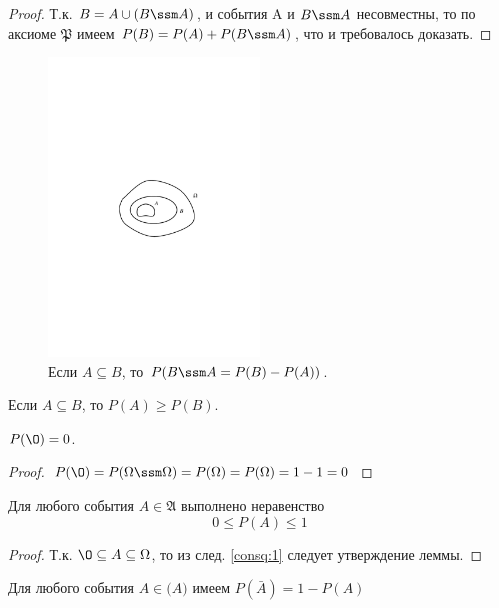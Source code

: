 \begin{proof}
	Т.к. $B=A\cup(B\ssm A)$,  и события A и $B\ssm A $ несовместны, то по аксиоме $\mathfrak{P}$ имеем $P(B)=P(A)+P(B\ssm A)$, что и требовалось доказать.
\end{proof}
\begin{figure}[H]
	\centering
	\includegraphics[width=0.5\textwidth]{pic/pic2.pdf}
	\caption{Если $A\subseteq B$, то $P(B\ssm A=P(B)-P(A))$.}
	\label{pic:2}
\end{figure}

\begin{consq}
	\label{consq:1}
	Если $A\subseteq B$, то $P(A)\geqslant P(B)$. 
\end{consq}

\begin{lemma}
	$P(\O)=0$.
\end{lemma}
\begin{proof}
	$P(\O)=P(\Omega\ssm\Omega)=P(\Omega)=P(\Omega)=1-1=0$
\end{proof}

\begin{lemma}
	Для любого события $A\in\mathfrak{A}$ выполнено неравенство
	\begin{equation*}
		0\leqslant P(A)\leqslant 1
	\end{equation*}
\end{lemma}
\begin{proof}
	Т.к. $\O\subseteq A\subseteq\Omega$, то из след. \ref{consq:1} следует утверждение леммы. 
\end{proof}

\begin{lemma}
	Для любого события $A\in\mathfrak(A)$ имеем $P(\bar{A})=1-P(A)$
\end{lemma}

